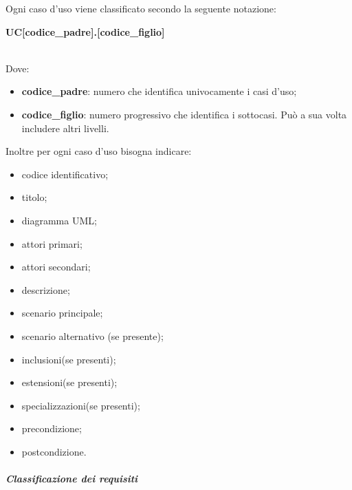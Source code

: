 Ogni caso d'uso viene classificato secondo la seguente notazione: \newline \newline
\centerline{\textbf{UC[codice\_padre].[codice\_figlio]}} \\
Dove:
	\begin{itemize}
		\item \textbf{codice\_padre}: numero che identifica univocamente i casi 
			d'uso;
		\item \textbf{codice\_figlio}: numero progressivo che identifica i 
			sottocasi. Può a sua volta includere altri livelli. \\
	\end{itemize}
Inoltre per ogni caso d'uso bisogna indicare:
	\begin{itemize}
		\item codice identificativo;
		\item titolo;
		\item diagramma UML\glo;
		\item attori primari;
		\item attori secondari;
		\item descrizione;
		\item scenario principale;
		\item scenario alternativo (se presente);
		\item inclusioni(se presenti);
		\item estensioni(se presenti);
		\item specializzazioni(se presenti);
		\item precondizione;
		\item postcondizione. \\
	\end{itemize}


\subparagraph{Classificazione dei requisiti} \mbox{}\\


